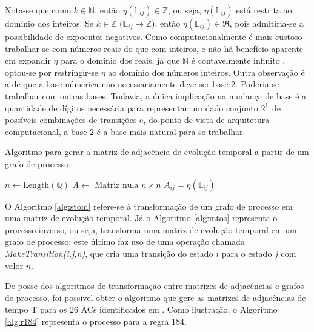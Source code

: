 \documentclass[a4,11pt]{article}
\begin{document}
Nota-se que como $k \in \mathbb{N}$, então $\eta(\mathbb{L}_{ij}) \in \mathbb{Z}$,
ou seja, $\eta(\mathbb{L}_{ij})$ está restrita ao domínio dos inteiros. Se
$k \in \mathbb{Z}$ ($\mathbb{L}_{ij} \mapsto \mathbb{Z}$), então
$\eta(\mathbb{L}_{ij}) \in \Re$, pois admitiria-se a possibilidade de expoentes negativos.
Como computacionalmente é mais custoso trabalhar-se com números reais do que com inteiros,
e não há benefício aparente em expandir $\eta$ para o domínio dos reais,
já que $\mathbb{N}$ é contavelmente infinito \cite{lewis2008}, optou-se
por restringir-se $\eta$ ao domínio dos números inteiros. Outra observação
é a de que a base númerica não necessariamente deve ser base 2. Poderia-se trabalhar com outras
bases. Todavia, a única implicação na mudança de base é a quantidade de dígitos
necessária para representar um dado conjunto $2^{\mathbb{L}}$ de possíveis combinações de
transições e, do ponto de vista de arquitetura computacional, a base 2 é a
base mais natural para se trabalhar.

\begin{algorithm}
\caption{Algoritmo para gerar a matriz de adjacência de evolução temporal a partir
de um grafo de processo.}
\label{alg:stom}
\begin{algorithmic}
\STATE $n \leftarrow \mbox{Length}(\mathbb{Q})$ 
\STATE $A \leftarrow \mbox{ Matriz nula } n \times n$
\STATE $A_{ij} = \eta(\mathbb{\mathbb{L}}_{ij})$
\ENDIF
\ENDFOR
\end{algorithmic}
\end{algorithm}

O Algoritmo \ref{alg:stom} refere-se à transformação de um grafo
de processo em uma matriz de evolução temporal. Já o Algoritmo \ref{alg:mtos}
representa o processo inverso, ou seja, transforma uma
matriz de evolução temporal em um grafo de processo; este último
faz uso de uma operação chamada \emph{MakeTransition(i,j,n)}, que cria uma transição
do estado $i$ para o estado $j$ com valor $n$.

De posse dos algoritmos de transformação entre matrizes de adjacências e grafos
de processo, foi possível obter o algoritmo que gere as matrizes de adjacências de tempo
T para os 26 ACs identificados em \cite{trafaniuc2004}. Como
ilustração, o Algoritmo \ref{alg:r184} representa o processo para a regra 184.
\end{document}
